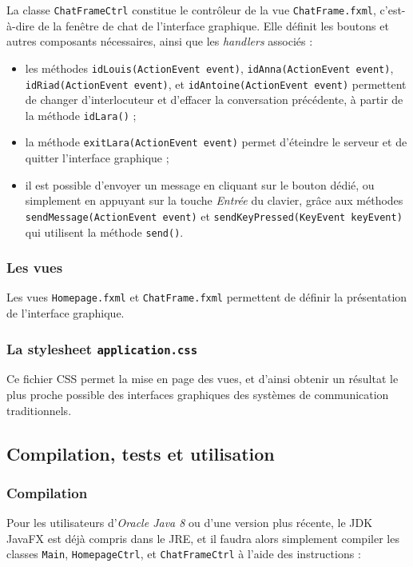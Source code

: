 \documentclass[10pt,a4paper]{article}
\begin{document}
La classe \texttt{ChatFrameCtrl} constitue le contrôleur de la vue \texttt{ChatFrame.fxml}, c'est-à-dire de la fenêtre de chat de l'interface graphique. Elle définit les boutons et autres composants nécessaires, ainsi que les \textit{handlers} associés :

\begin{itemize}
    \item les méthodes \texttt{idLouis(ActionEvent event)}, \texttt{idAnna(ActionEvent event)}, \texttt{idRiad(ActionEvent event)}, et \texttt{idAntoine(ActionEvent event)} permettent de changer d'interlocuteur et d'effacer la conversation précédente, à partir de la méthode \texttt{idLara()} ;
    \item la méthode \texttt{exitLara(ActionEvent event)} permet d'éteindre le serveur et de quitter l'interface graphique ;
    \item il est possible d'envoyer un message en cliquant sur le bouton dédié, ou simplement en appuyant sur la touche \textit{Entrée} du clavier, grâce aux méthodes \texttt{sendMessage(ActionEvent event)} et \texttt{sendKeyPressed(KeyEvent keyEvent)} qui utilisent la méthode \texttt{send()}.
\end{itemize}

\subsubsection{Les vues}

Les vues \texttt{Homepage.fxml} et \texttt{ChatFrame.fxml} permettent de définir la présentation de l'interface graphique.

\subsubsection{La stylesheet \texttt{application.css}}

Ce fichier CSS permet la mise en page des vues, et d'ainsi obtenir un résultat le plus proche possible des interfaces graphiques des systèmes de communication traditionnels. 

\subsection{Compilation, tests et utilisation}

\subsubsection{Compilation}
Pour les utilisateurs d'\textit{Oracle Java 8} ou d'une version plus récente, le JDK JavaFX est déjà compris dans le JRE, et il faudra alors simplement compiler les classes \texttt{Main}, \texttt{HomepageCtrl}, et \texttt{ChatFrameCtrl} à l'aide des instructions : 
\end{document}
